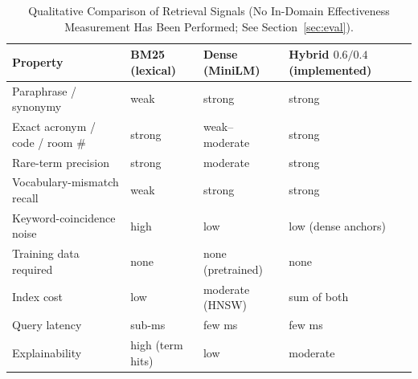 \begin{table}[!t]
\centering
\caption{Qualitative Comparison of Retrieval Signals (No In-Domain
Effectiveness Measurement Has Been Performed; See Section~\ref{sec:eval}).}
\label{tab:retrieval}
\footnotesize
\renewcommand{\arraystretch}{1.2}
\begin{tabular}{@{}p{1.9cm}p{1.75cm}p{1.75cm}p{1.9cm}@{}}
\toprule
\textbf{Property} & \textbf{BM25 (lexical)} & \textbf{Dense (MiniLM)} & \textbf{Hybrid $0.6/0.4$ (implemented)} \\
\midrule
Paraphrase / synonymy & weak & strong & strong \\
Exact acronym / code / room \# & strong & weak--moderate & strong \\
Rare-term precision & strong & moderate & strong \\
Vocabulary-mismatch recall & weak & strong & strong \\
Keyword-coincidence noise & high & low & low (dense anchors) \\
Training data required & none & none (pretrained) & none \\
Index cost & low & moderate (HNSW) & sum of both \\
Query latency & sub-ms & few ms & few ms \\
Explainability & high (term hits) & low & moderate \\
\bottomrule
\end{tabular}
\end{table}
